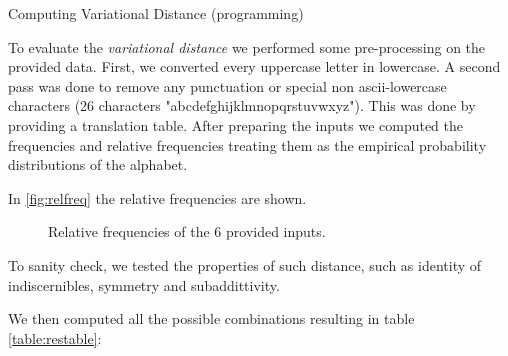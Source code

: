\documentclass[a4paper,10pt]{article}
\begin{document}
\begin{nproblem}{8}{Computing Variational Distance (programming)}
\begin{solution}
To evaluate the \textit{variational distance} we performed some pre-processing
on the provided data.
First, we converted every uppercase letter in lowercase.
A second pass was done to remove any punctuation or special non ascii-lowercase
characters (26 characters "abcdefghijklmnopqrstuvwxyz"). This was
done by providing a translation table. After preparing the inputs we computed
the frequencies and relative frequencies treating them as the empirical probability
distributions of the alphabet.

In \autoref{fig:relfreq} the relative frequencies are shown.

\noindent
\begin{figure}[H]
    \centering
    \caption{Relative frequencies of the 6 provided inputs.}
    \label{fig:relfreq}
\end{figure}

To sanity check, we tested the properties of such distance, such as identity of indiscernibles,
symmetry and subaddittivity.

We then computed all the possible combinations resulting in table \autoref{table:restable}:



\end{solution}
\end{nproblem}
\end{document}
